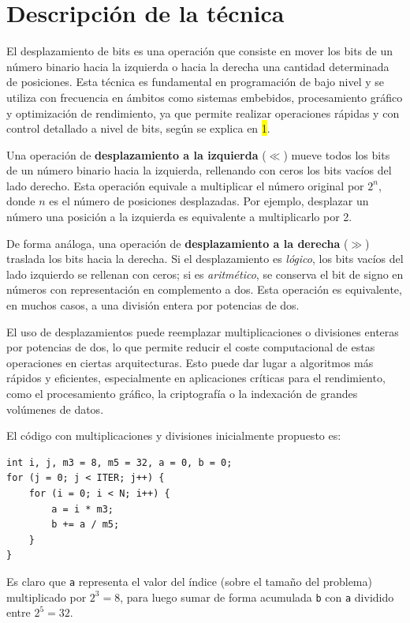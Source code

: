 \documentclass[11pt,a4paper,twoside]{article}
\theoremstyle{definition}
\begin{document}
	\section{Descripción de la técnica}

	El desplazamiento de bits es una operación que consiste en mover los bits de un número binario hacia la izquierda o hacia la derecha una cantidad determinada de posiciones. Esta técnica es fundamental en programación de bajo nivel y se utiliza con frecuencia en ámbitos como sistemas embebidos, procesamiento gráfico y optimización de rendimiento, ya que permite realizar operaciones rápidas y con control detallado a nivel de bits, según se explica en \colorbox{yellow}{1}.
	
	Una operación de \textbf{desplazamiento a la izquierda} ($\ll$) mueve todos los bits de un número binario hacia la izquierda, rellenando con ceros los bits vacíos del lado derecho. Esta operación equivale a multiplicar el número original por $2^n$, donde $n$ es el número de posiciones desplazadas. Por ejemplo, desplazar un número una posición a la izquierda es equivalente a multiplicarlo por 2.
	
	De forma análoga, una operación de \textbf{desplazamiento a la derecha} ($\gg$) traslada los bits hacia la derecha. Si el desplazamiento es \emph{lógico}, los bits vacíos del lado izquierdo se rellenan con ceros; si es \emph{aritmético}, se conserva el bit de signo en números con representación en complemento a dos. Esta operación es equivalente, en muchos casos, a una división entera por potencias de dos.
	
	El uso de desplazamientos puede reemplazar multiplicaciones o divisiones enteras por potencias de dos, lo que permite reducir el coste computacional de estas operaciones en ciertas arquitecturas. Esto puede dar lugar a algoritmos más rápidos y eficientes, especialmente en aplicaciones críticas para el rendimiento, como el procesamiento gráfico, la criptografía o la indexación de grandes volúmenes de datos.
	
	El código con multiplicaciones y divisiones inicialmente propuesto es:
	\begin{verbatim}
int i, j, m3 = 8, m5 = 32, a = 0, b = 0;
for (j = 0; j < ITER; j++) {
	for (i = 0; i < N; i++) {
		a = i * m3;
		b += a / m5;
	}
}
	\end{verbatim}

	Es claro que \texttt{a} representa el valor del índice (sobre el tamaño del problema) multiplicado por $2^3=8$, para luego sumar de forma acumulada \texttt{b} con \texttt{a} dividido entre $2^5=32$.
\end{document}

